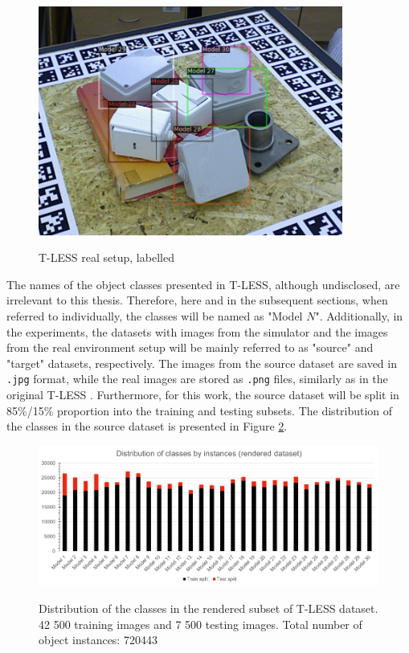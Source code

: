 \documentclass[english, 12pt, a4paper, elec, utf8, a-1b, online]{aaltothesis}
\begin{document}
\begin{figure}[htb]
	\begin{center}
		\includegraphics[width=10cm]{./tless_real_annotated.png}
	\end{center}
	\caption{T-LESS real setup, labelled
\cite{hodan2017tless}}
	\begin{center}
		\label{tless_real_example}
	\end{center}
\end{figure}
\FloatBarrier

The names of the object classes presented in T-LESS, although undisclosed, are irrelevant to this thesis. Therefore, here and in the subsequent sections, when referred to individually, the classes will be named as "Model $N$". Additionally, in the experiments, the datasets with images from the simulator and the images from the real environment setup will be mainly referred to as "source" and "target" datasets, respectively. The images from the source dataset are saved in \texttt{.jpg} format, while the real images are stored as \texttt{.png} files, similarly as in the original T-LESS \cite{hodan2017tless}. Furthermore, for this work, the source dataset will be split in 85\%/15\%  proportion into the training and testing subsets. The distribution of the classes in the source dataset is presented in Figure \ref{tless_distribution}.  

\begin{figure}[htb]
	\begin{center}
		\includegraphics[width=14cm]{./rendered_distribution.png}
	\end{center}
	\caption{Distribution of the classes in the rendered subset of T-LESS dataset. 42 500 training images and 7 500 testing images. Total number of object instances: 720443}
	\begin{center}
		\label{tless_distribution}
	\end{center}
\end{figure}
\FloatBarrier
\end{document}
